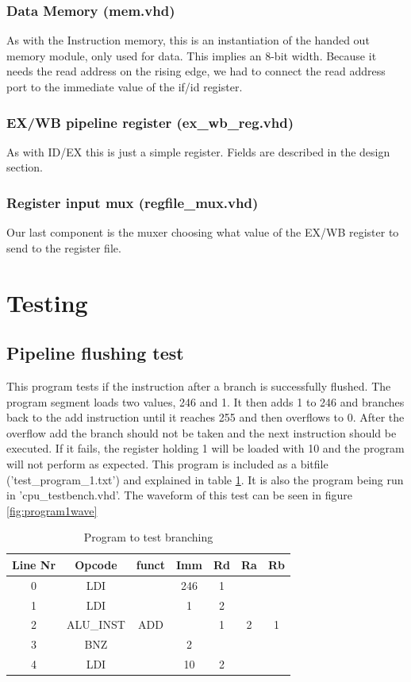 \documentclass[11pt]{report}
\begin{document}
\subsubsection*{Data Memory (mem.vhd)}
As with the Instruction memory, this is an instantiation of the handed out memory
module, only used for data. This implies an 8-bit width. Because it needs the read address
on the rising edge, we had to connect the read address port to the immediate value of the
if/id register.
\subsubsection*{EX/WB pipeline register (ex\_wb\_reg.vhd)}
As with ID/EX this is just a simple register. Fields are described in the design section.
\subsubsection*{Register input mux (regfile\_mux.vhd)}
Our last component is the muxer choosing what value of the EX/WB register to send to the
register file. 


\section*{Testing}

\subsection*{Pipeline flushing test}

This program tests if the instruction after a branch is successfully flushed.
The program segment loads two values, 246 and 1. It then adds 1 to 246 and
branches back to the add instruction until it reaches 255 and then overflows
to 0. After the overflow add the branch should not be taken and the next instruction
should be executed. If it fails, the register holding 1 will be loaded with 10
and the program will not perform as expected. This program is included as a bitfile
('test\_program\_1.txt') and explained in table \ref{tab:program1table}. It is also the 
program being run in 'cpu\_testbench.vhd'.
The waveform of this test can be seen in figure \ref{fig:program1wave}

\begin{table}[htbp]
  \centering
  \begin{tabular}{|c|c|c|c|c|c|c|}
    \hline
    Line Nr &	Opcode		&	funct	&	Imm	&	Rd	&	Ra	&	Rb	\\\hline
    	0	&	LDI			&			&	246	&	1	&		&		\\\hline
    	1	&	LDI			&			&	1	&	2	&		&		\\\hline
    	2	&	ALU\_INST	&	ADD		&		&	1	&	2	&	1	\\\hline
    	3	&	BNZ			&			&	2	&		&		&		\\\hline
    	4	&	LDI			&			&	10	&	2	&		&		\\\hline
  \end{tabular}
  \caption{Program to test branching}
  \label{tab:program1table}
\end{table}
\end{document}
